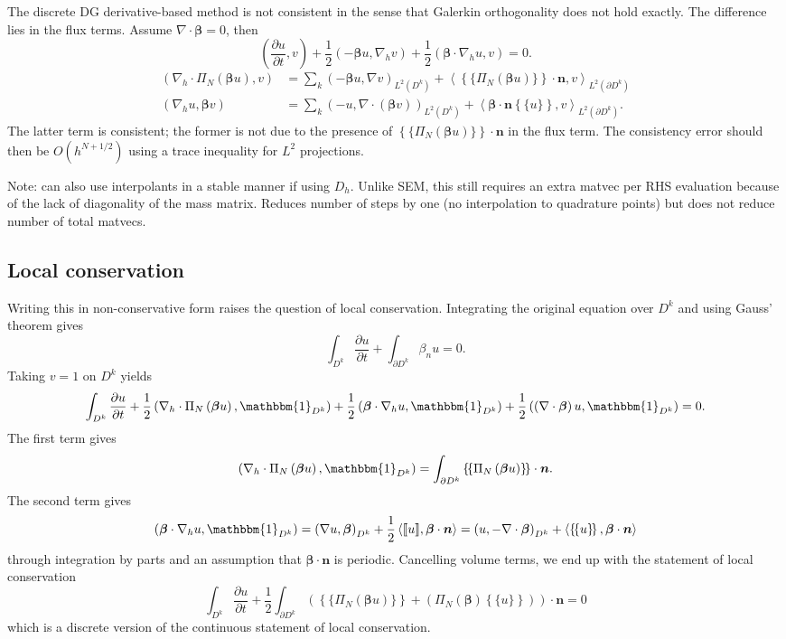 \documentclass[preprint,10pt]{article}
\theoremstyle{definition}
\theoremstyle{lemma}
\newcommand{\bbm}[1]{\mathbbm{#1}}
\newcommand{\pd}[2]{\frac{\partial#1}{\partial#2}}
\newcommand{\LRp}[1]{\left( #1 \right)}
\newcommand{\LRa}[1]{\left\langle #1 \right\rangle}
\newcommand{\LRc}[1]{\left\{ #1 \right\}}
\newcommand{\Grad} {\ensuremath{\nabla}}
\newcommand{\Div} {\ensuremath{\nabla\cdot}}
\newcommand{\jump}[1] {\ensuremath{\llbracket#1\rrbracket}}
\newcommand{\avg}[1] {\ensuremath{\LRc{\!\{#1\}\!}}}
\newcommand{\LK}{L^2\LRp{D^k}}
\newcommand{\LdK}{L^2\LRp{\partial D^k}}
\begin{document}
The discrete DG derivative-based method is not consistent in the sense that Galerkin orthogonality does not hold exactly.  The difference lies in the flux terms.  Assume $\Div \bm{\beta} = 0$, then
\[
\LRp{\pd{u}{t},v} + \frac{1}{2}\LRp{-{ \bm{\beta}u},\Grad_h v} + \frac{1}{2}\LRp{\bm{\beta}\cdot\Grad_h u,v} = 0.
\]
\begin{align*}
\LRp{\Grad_h\cdot \Pi_N\LRp{ \bm{\beta}u},v} &= \sum_{k} \LRp{-\bm{\beta}u, \Grad v}_{\LK} + \LRa{\avg{\Pi_N\LRp{\bm{\beta} u}}\cdot \bm{n},v}_{\LdK}\\
\LRp{\Grad_h u,\bm{\beta}v} &= \sum_{k} \LRp{-u, \Grad \cdot \LRp{\bm{\beta}v}}_{\LK} + \LRa{\bm{\beta}\cdot\bm{n}\avg{u},v}_{\LdK}.
\end{align*}
The latter term is consistent; the former is not due to the presence of $\avg{\Pi_N\LRp{\bm{\beta} u}}\cdot \bm{n}$ in the flux term.  The consistency error should then be $O(h^{N+1/2})$ using a trace inequality for $L^2$ projections.  

Note: can also use interpolants in a stable manner if using $D_h$.  Unlike SEM, this still requires an extra matvec per RHS evaluation because of the lack of diagonality of the mass matrix.  Reduces number of steps by one (no interpolation to quadrature points) but does not reduce number of total matvecs.  

\subsection{Local conservation}

Writing this in non-conservative form raises the question of local conservation.  Integrating the original equation over $D^k$ and using Gauss' theorem gives
\[
\int_{D^k}\pd{u}{t} + \int_{\partial D^k} \beta_n u = 0.
\]
Taking $v = 1$ on $D^k$ yields
\[
\int_{D^k}\pd{u}{t} + \frac{1}{2}\LRp{\Grad_h\cdot \Pi_N \LRp{ \bm{\beta}u},\bbm{1}_{D^k}} + \frac{1}{2}\LRp{\bm{\beta}\cdot\Grad_h u,\bbm{1}_{D^k}} + \frac{1}{2}\LRp{\LRp{\Grad\cdot \bm{\beta}} u,\bbm{1}_{D^k}} = 0.
\]
The first term gives
\[
\LRp{\Grad_h\cdot \Pi_N \LRp{ \bm{\beta}u},\bbm{1}_{D^k}} = \int_{\partial D^k} \avg{\Pi_N\LRp{\bm{\beta}u}}\cdot\bm{n}.
\]
The second term gives
\[
\LRp{\bm{\beta}\cdot\Grad_h u,\bbm{1}_{D^k}} = \LRp{\Grad u,\bm{\beta}}_{D^k} + \frac{1}{2}\LRa{\jump{u},\bm{\beta}\cdot\bm{n}} = \LRp{u,-\Grad \cdot \bm{\beta}}_{D^k} + \LRa{\avg{u},\bm{\beta}\cdot\bm{n}}
\]
through integration by parts and an assumption that $\bm{\beta}\cdot \bm{n}$ is periodic.  Cancelling volume terms, we end up with the statement of local conservation 
\[
\int_{D^k} \pd{u}{t}  + \frac{1}{2}\int_{\partial D^k} \LRp{\avg{\Pi_N\LRp{\bm{\beta}u}} + \LRp{\Pi_N\LRp{\bm{\beta}}\avg{u}}}\cdot\bm{n} = 0
\]
which is a discrete version of the continuous statement of local conservation.
\end{document}
